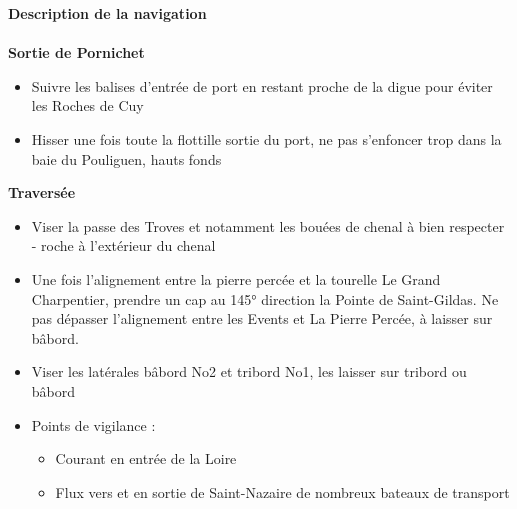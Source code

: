 \begin{minipage}[c][\textheight][t]{0.10\textwidth}
\hfill
\end{minipage}%
\begin{minipage}[c][\textheight][t]{0.50\textwidth}
    \vspace{1cm}
    \color{StrongBlue}    
    {\huge \textbf{Description de la navigation}}\\
    \vspace{0.1cm}\\
    {\large \textbf{Sortie de Pornichet}}\\
        \begin{itemize}
                \itemsep0em 
                \item Suivre les balises d'entrée de port en restant proche de la digue pour éviter les Roches de Cuy
                \item Hisser une fois toute la flottille sortie du port, ne pas s’enfoncer trop dans la baie du Pouliguen, hauts fonds
        \end{itemize}
    {\large \textbf{Traversée}}\\
        \begin{itemize}
                \itemsep0em 
                \item Viser la passe des Troves et notamment les bouées de chenal à bien respecter - roche à l’extérieur du chenal
                \item Une fois l’alignement entre la pierre percée et la tourelle Le Grand Charpentier, prendre un cap au 145° direction la Pointe de Saint-Gildas. Ne pas dépasser l’alignement entre les Events et La Pierre Percée, à laisser sur bâbord.
                \item Viser les latérales bâbord No2 et tribord No1, les laisser sur tribord ou bâbord
                \item Points de vigilance : 
                \begin{itemize}
                    \item Courant en entrée de la Loire
                    \item Flux vers et en sortie de Saint-Nazaire de nombreux bateaux de transport
                \end{itemize}
        \end{itemize}
        \begin{minipage}[c]{0.70\textwidth}
        \begin{itemize}

\end{itemize}
\end{minipage}
\end{minipage}
